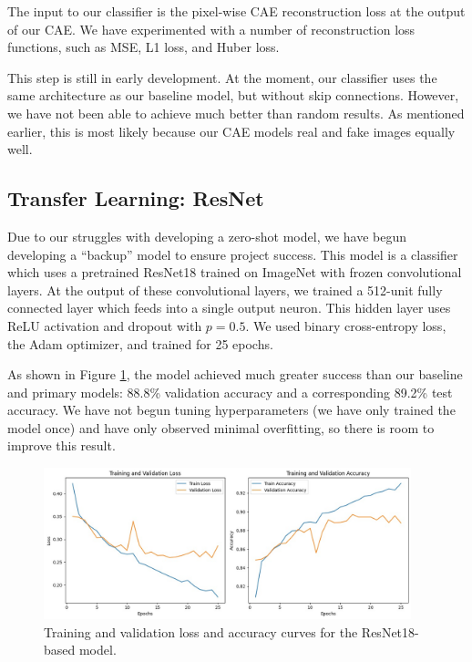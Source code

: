 \documentclass{article} %
\begin{document}
The input to our classifier is the pixel-wise CAE reconstruction loss at the output of our CAE. We have experimented with a number of reconstruction loss functions, such as MSE, L1 loss, and Huber loss.

This step is still in early development. At the moment, our classifier uses the same architecture as our baseline model, but without skip connections. However, we have not been able to achieve much better than random results. As mentioned earlier, this is most likely because our CAE models real and fake images equally well.
\subsection{Transfer Learning: ResNet}
\label{transfer_learning}

Due to our struggles with developing a zero-shot model, we have begun developing a ``backup'' model to ensure project success. This model is a classifier which uses a pretrained ResNet18 trained on ImageNet with frozen convolutional layers. At the output of these convolutional layers, we trained a 512-unit fully connected layer which feeds into a single output neuron. This hidden layer uses ReLU activation and dropout with $p=0.5$. We used binary cross-entropy loss, the Adam optimizer, and trained for 25 epochs.

As shown in Figure \ref{fig:transfer_curves}, the model achieved much greater success than our baseline and primary models: 88.8\% validation accuracy and a corresponding 89.2\% test accuracy. We have not begun tuning hyperparameters (we have only trained the model once) and have only observed minimal overfitting, so there is room to improve this result.

\begin{figure}[h]
    \begin{center}
        \includegraphics[width=0.95\textwidth]{figs/transfer learning graphs.jpg}
    \end{center}
    \caption{Training and validation loss and accuracy curves for the ResNet18-based model.}
    \label{fig:transfer_curves}
\end{figure}
\end{document}
